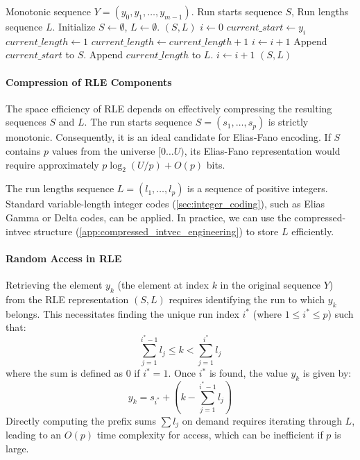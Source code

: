 \begin{algorithm}
    \caption{$\textsc{Encode}(Y)$}
    \label{alg:rle_encode_theory}
    \small
    \begin{algorithmic}[1]
        \Require Monotonic sequence $Y = (y_0, y_1, \dots, y_{m-1})$.
        \Ensure Run starts sequence $S$, Run lengths sequence $L$.
        \State Initialize $S \leftarrow \emptyset$, $L \leftarrow \emptyset$.
         \Return $(S, L)$ \EndIf
        \State $i \leftarrow 0$
        \State $current\_start \leftarrow y_i$
        \State $current\_length \leftarrow 1$
        \State $current\_length \leftarrow current\_length + 1$
        \State $i \leftarrow i + 1$
        \EndWhile
        \State Append $current\_start$ to $S$.
        \State Append $current\_length$ to $L$.
        \State $i \leftarrow i + 1$
        \EndWhile
        \State \Return $(S, L)$
    \end{algorithmic}
\end{algorithm}

\paragraph{Compression of RLE Components}
The space efficiency of RLE depends on effectively compressing the resulting sequences $S$ and $L$.
The run starts sequence $S = (s_1, \dots, s_p)$ is strictly monotonic. Consequently, it is an ideal candidate for Elias-Fano encoding. If $S$ contains $p$ values from the universe $[0 \dots U)$, its Elias-Fano representation would require approximately $p \log_2(U/p) + O(p)$ bits.

The run lengths sequence $L = (l_1, \dots, l_p)$ is a sequence of positive integers. Standard variable-length integer codes (\autoref{sec:integer_coding}), such as Elias Gamma or Delta codes, can be applied. In practice, we can use the \textsf{compressed-intvec} structure (\autoref{app:compressed_intvec_engineering}) to store $L$ efficiently.

\paragraph{Random Access in RLE}
Retrieving the element $y_k$ (the element at index $k$ in the original sequence $Y$) from the RLE representation $(S, L)$ requires identifying the run to which $y_k$ belongs. This necessitates finding the unique run index $i^*$ (where $1 \le i^* \le p$) such that:
\[ \sum_{j=1}^{i^*-1} l_j \le k < \sum_{j=1}^{i^*} l_j \]
where the sum is defined as $0$ if $i^*=1$. Once $i^*$ is found, the value $y_k$ is given by:
\[ y_k = s_{i^*} + \left( k - \sum_{j=1}^{i^*-1} l_j \right) \]
Directly computing the prefix sums $\sum l_j$ on demand requires iterating through $L$, leading to an $O(p)$ time complexity for access, which can be inefficient if $p$ is large.

